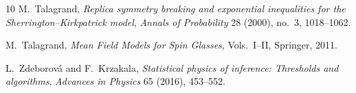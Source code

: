 \documentclass[11pt]{article}
\numberwithin{equation}{section}
\newcommand{\1}{\mathbf 1}
\begin{document}
\begin{thebibliography}{10}
M.~Talagrand,
\newblock
\emph{Replica symmetry breaking and exponential inequalities for the
Sherrington--Kirkpatrick model},
\newblock \emph{Annals of Probability} 28 (2000), no.~3, 1018--1062.

M.~Talagrand,
\newblock
\emph{Mean Field Models for Spin Glasses}, Vols.~I--II,
\newblock Springer, 2011.

L.~Zdeborov{\'a} and F.~Krzakala,
\newblock
\emph{Statistical physics of inference: Thresholds and algorithms},
\newblock \emph{Advances in Physics} 65 (2016), 453--552.

\end{thebibliography}
\end{document}

